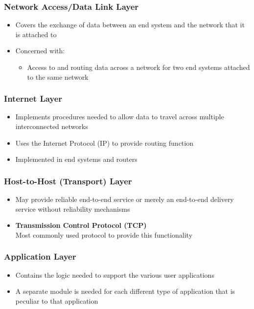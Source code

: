 \documentclass[pdflatex,compress]{beamer}
\begin{document}
\begin{frame}
	\frametitle{Network Access/Data Link Layer}
	\begin{itemize}
		\item Covers the exchange of data between an end system and the network that it is attached to
		\item Concerned with:
		\begin{itemize}
			\item Access to and routing data across a network for two end systems attached to the same network
		\end{itemize}
	\end{itemize}
\end{frame}

\begin{frame}
	\frametitle{Internet Layer}
	\begin{itemize}
		\item Implements procedures needed to allow data to travel across multiple interconnected networks
		\item Uses the Internet Protocol (IP) to provide routing function
		\item Implemented in end systems and routers
	\end{itemize}
\end{frame}

\begin{frame}
	\frametitle{Host-to-Host (Transport) Layer}
	\begin{itemize}
		\item May provide reliable end-to-end service or merely an end-to-end delivery service without reliability mechanisms
		\item \textbf{Transmission Control Protocol (TCP)}\\
		Most commonly used protocol to provide this functionality
	\end{itemize}
\end{frame}

\begin{frame}
	\frametitle{Application Layer}
	\begin{itemize}
		\item Contains the logic needed to support the various user applications
		\item A separate module is needed for each different type of application that is peculiar to that application
	\end{itemize}
\end{frame}
\end{document}
